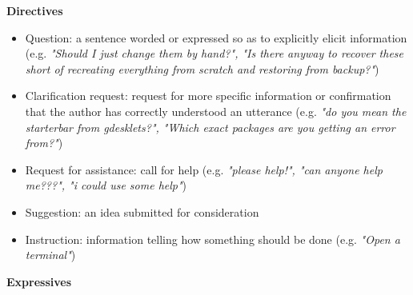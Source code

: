 \documentclass[11pt]{article}
\begin{document}
\textbf{Directives}

\begin{itemize}
	\item Question: a sentence worded or expressed so as to explicitly elicit information (e.g. \textit{"Should I just change them by hand?", "Is there anyway to recover these short of recreating everything from scratch and restoring from backup?"})
		\item Clarification request: request for more specific information or confirmation that the author has correctly understood an utterance (e.g. \textit{"do you mean the starterbar from gdesklets?", "Which exact packages are you getting an error from?"})
	\item Request for assistance: call for help (e.g. \textit{"please help!", "can anyone help me???", "i could use some help"})
	\item Suggestion: an idea submitted for consideration
	\item Instruction: information telling how something should be done (e.g. \textit{"Open a terminal"})
\end{itemize}

\textbf{Expressives}
\end{document}
